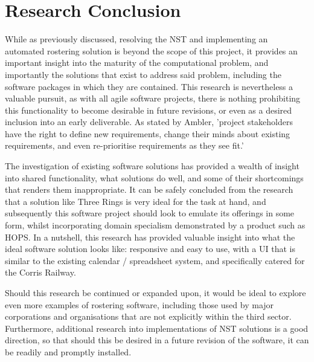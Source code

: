 \section{Research Conclusion}
While as previously discussed, resolving the NST and implementing an automated rostering solution is beyond the scope of this project, it provides an important insight into the maturity of the computational problem, and importantly the solutions that exist to address said problem, including the software packages in which they are contained. This research is nevertheless a valuable pursuit, as with all agile software projects, there is nothing prohibiting this functionality to become desirable in future revisions, or even as a desired inclusion into an early deliverable. As stated by Ambler, 'project stakeholders have the right to define new requirements, change their minds about existing requirements, and even re-prioritise requirements as they see fit.' \cite{Ambler2}

The investigation of existing software solutions has provided a wealth of insight into shared functionality, what solutions do well, and some of their shortcomings that renders them inappropriate. It can be safely concluded from the research that a solution like Three Rings is very ideal for the task at hand, and subsequently this software project should look to emulate its offerings in some form, whilst incorporating domain specialism demonstrated by a product such as HOPS. In a nutshell, this research has provided valuable insight into what the ideal software solution looks like: responsive and easy to use, with a UI that is similar to the existing calendar / spreadsheet system, and specifically catered for the Corris Railway.

Should this research be continued or expanded upon, it would be ideal to explore even more examples of rostering software, including those used by major corporations and organisations that are not explicitly within the third sector. Furthermore, additional research into implementations of NST solutions is a good direction, so that should this be desired in a future revision of the software, it can be readily and promptly installed.